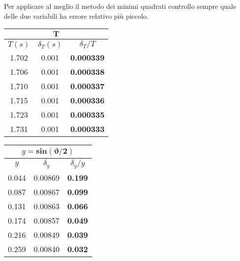 \documentclass{article}
\begin{document}
Per applicare al meglio il metodo dei minimi quadrati controllo sempre quale delle due variabili ha errore relativo più piccolo.

\begin{minipage}{0.5\textwidth}
	\begin{table}[H]
		\centering
		\begin{tabular}{@{}ccc@{}}
			\multicolumn{3}{c}{$\mathbf{T}$} \\ \midrule
			$T(s)$ & $\delta_T (s)$ & $\delta_T / T$ \\ \midrule
			1.702 & 0.001 & \textbf{0.000339} \\
			1.706 & 0.001 & \textbf{0.000338} \\
			1.710 & 0.001 & \textbf{0.000337} \\
			1.715 & 0.001 & \textbf{0.000336} \\
			1.723 & 0.001 & \textbf{0.000335} \\
			1.731 & 0.001 & \textbf{0.000333}  \\ \bottomrule   
		\end{tabular}
	\end{table}
\end{minipage}
\begin{minipage}{0.5\textwidth}
	\begin{table}[H]
		\centering
		\begin{tabular}{@{}ccc@{}}
			
			\multicolumn{3}{c}{$y = \mathbf{sin{\left(\vartheta/2\right)}}$} \\ \midrule
			$y$ & $\delta_y$ & $\delta_y / y$ \\ \midrule
			0.044 & 0.00869 & \textbf{0.199} \\
			0.087 & 0.00867 & \textbf{0.099} \\
			0.131 & 0.00863 & \textbf{0.066} \\
			0.174 & 0.00857 & \textbf{0.049} \\
			0.216 & 0.00849 & \textbf{0.039} \\
			0.259 & 0.00840 & \textbf{0.032}  \\ \bottomrule  
		\end{tabular}
	\end{table}
\end{minipage}
\vspace{1cm}
\end{document}
